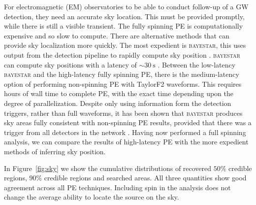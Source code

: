 For electromagnetic (EM) observatories to be able to conduct follow-up of a GW detection, they need an accurate sky location. This must be provided promptly, while there is still a visible transient. The fully spinning PE is computationally expensive and so slow to compute. There are alternative methods that can provide sky localization more quickly. The most expedient is \textsc{bayestar}, this uses output from the detection pipeline to rapidly compute sky position \citep{Singer_2014}. \textsc{bayestar} can compute sky positions with a latency of $\sim30~\mathrm{s}$ \citep{Berry_2014}. Between the low-latency \textsc{bayestar} and the high-latency fully spinning PE, there is the medium-latency option of performing non-spinning PE with TaylorF2 waveforms. This requires hours of wall time to complete PE, with the exact time depending upon the degree of parallelization. Despite only using information form the detection triggers, rather than full waveforms, it has been shown that \textsc{bayestar} produces sky areas fully consistent with non-spinning PE results, provided that there was a trigger from all detectors in the network \citep{Singer_2014,Berry_2014}. Having now performed a full spinning analysis, we can compare the results of high-latency PE with the more expedient methods of inferring sky position.

In Figure~\ref{fig:sky} we show the cumulative distributions of recovered $50\%$ credible regions, $90\%$ credible regions and searched areas. All three quantities show good agreement across all PE techniques. %
Including spin in the analysis does not change the average ability to locate the source on the sky.

  